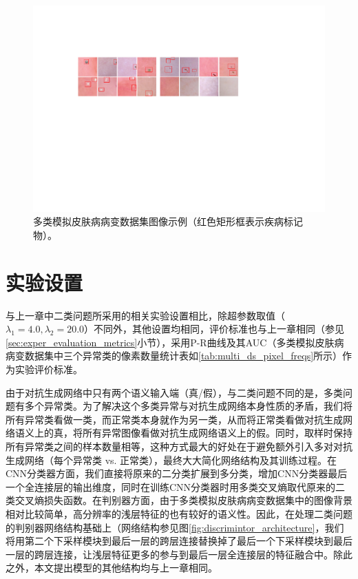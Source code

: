 \begin{figure}[h]
	\centering
	\includegraphics[width=1.0\textwidth]{figure/multi_classes_simulated_skin.pdf}
	\caption[多类模拟皮肤病病变数据集图像示例]{多类模拟皮肤病病变数据集图像示例（红色矩形框表示疾病标记物）。}
	\label{fig:mul_classes_simulated_ds}
\end{figure}

\section{实验设置}\label{sec:multi_classes_experiment_setting}
与上一章中二类问题所采用的相关实验设置相比，除超参数取值（$\lambda_{1}=4.0,\lambda_{2}=20.0$）不同外，其他设置均相同，评价标准也与上一章相同（参见\ref{sec:exper_evaluation_metrics}小节），采用P-R曲线及其AUC（多类模拟皮肤病病变数据集中三个异常类的像素数量统计表如\ref{tab:multi_ds_pixel_freqs}所示）作为实验评价标准。

由于对抗生成网络中只有两个语义输入端（真/假），与二类问题不同的是，多类问题有多个异常类。为了解决这个多类异常与对抗生成网络本身性质的矛盾，我们将所有异常类看做一类，而正常类本身就作为另一类，从而将正常类看做对抗生成网络语义上的真，将所有异常图像看做对抗生成网络语义上的假。同时，取样时保持所有异常类之间的样本数量相等，这种方式最大的好处在于避免额外引入多对对抗生成网络（每个异常类 vs. 正常类），最终大大简化网络结构及其训练过程。在CNN分类器方面，我们直接将原来的二分类扩展到多分类，增加CNN分类器最后一个全连接层的输出维度，同时在训练CNN分类器时用多类交叉熵取代原来的二类交叉熵损失函数。在判别器方面，由于多类模拟皮肤病病变数据集中的图像背景相对比较简单，高分辨率的浅层特征的也有较好的语义性。因此，在处理二类问题的判别器网络结构基础上（网络结构参见图\ref{fig:discrimintor_architecture}，我们将用第二个下采样模块到最后一层的跨层连接替换掉了最后一个下采样模块到最后一层的跨层连接，让浅层特征更多的参与到最后一层全连接层的特征融合中。除此之外，本文提出模型的其他结构均与上一章相同。

